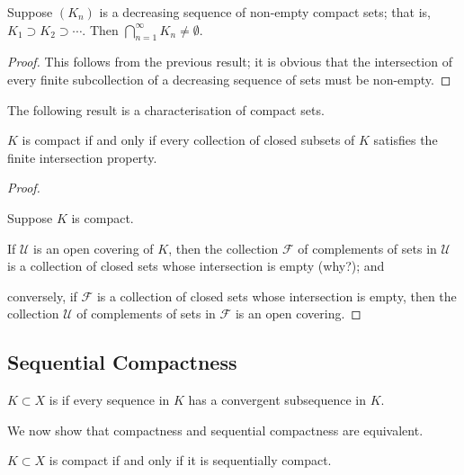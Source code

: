 \begin{theorem}\label{thrm:cantor-intersection}
Suppose $(K_n)$ is a decreasing sequence of non-empty compact sets; that is, $K_1\supset K_2\supset\cdots$. Then $\bigcap_{n=1}^\infty K_n\neq\emptyset$.
\end{theorem}

\begin{proof}
This follows from the previous result; it is obvious that the intersection of every finite subcollection of a decreasing sequence of sets must be non-empty.
\end{proof}

The following result is a characterisation of compact sets.

\begin{proposition}
$K$ is compact if and only if every collection of closed subsets of $K$ satisfies the finite intersection property.
\end{proposition}

\begin{proof} \

\fbox{$\implies$} Suppose $K$ is compact.

If $\mathcal{U}$ is an open covering of $K$, then the collection $\mathcal{F}$ of complements of sets in $\mathcal{U}$ is a collection of closed sets whose intersection is empty (why?); and 

conversely, if $\mathcal{F}$ is a collection of closed sets whose intersection is empty, then the collection $\mathcal{U}$ of complements of sets in $\mathcal{F}$ is an open covering.

\end{proof}

\subsection{Sequential Compactness}
\begin{definition}
$K\subset X$ is  if every sequence in $K$ has a convergent subsequence in $K$.
\end{definition}

We now show that compactness and sequential compactness are equivalent.

\begin{proposition}
$K\subset X$ is compact if and only if it is sequentially compact.
\end{proposition}

